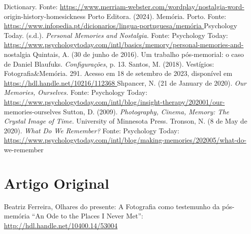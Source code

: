 \documentclass{article}
\begin{document}
Dictionary. Fonte: \url{https://www.merriam-webster.com/wordplay/nostalgia-word-}
origin-history-homesickness 
Porto Editora. (2024). Memória. Porto. Fonte: 
\url{https://www.infopedia.pt/dicionarios/lingua-portuguesa/memória }
Psychology Today. (s.d.). \textit{Personal Memories and Nostalgia.} Fonte: Psychology Today: 
\url{https://www.psychologytoday.com/intl/basics/memory/personal-memories-and-}
nostalgia 
Quintais, A. (30 de junho de 2016). Um trabalho pós-memorial: o caso de Daniel 
Blaufuks. \textit{Configurações}, p. 13. 
Santos, M. (2018). Vestígios: Fotografia\&Memória. 291. Acesso em 18 de setembro de 
2023, disponível em \url{https://hdl.handle.net/10216/112368 }
Shpancer, N. (21 de January de 2020). \textit{Our Memories, Ourselves.} Fonte: Psychology 
Today: \url{https://www.psychologytoday.com/intl/blog/insight-therapy/202001/our-}
memories-ourselves 
Sutton, D. (2009). \textit{Photography, Cinema, Memory: The Crystal Image of Time.} 
University of Minnesota Press. 
Tronson, N. (8 de May de 2020). \textit{What Do We Remember?} Fonte: Psychology Today: 
\url{https://www.psychologytoday.com/intl/blog/making-memories/202005/what-do-}
we-remember


\section*{Artigo Original}
Beatriz Ferreira, Olhares do presente: A Fotografia como testemunho da pós-memória “An Ode to the Places I Never Met”: \url{http://hdl.handle.net/10400.14/53004}
\end{document}

